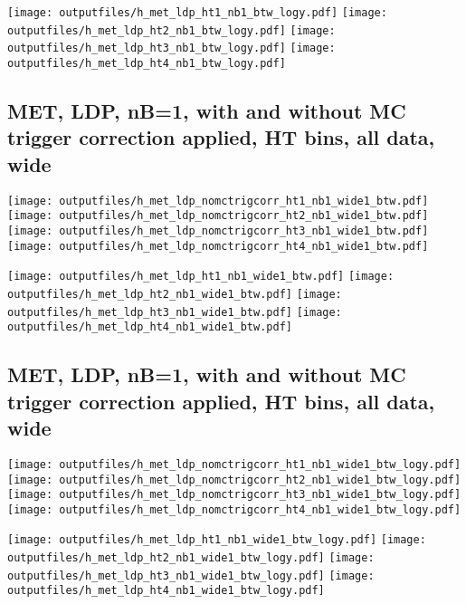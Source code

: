 \documentclass[11pt]{article}
\begin{document}
    \noindent
     \texttt{[image: outputfiles/h\_met\_ldp\_ht1\_nb1\_btw\_logy.pdf]}
     \texttt{[image: outputfiles/h\_met\_ldp\_ht2\_nb1\_btw\_logy.pdf]}
     \texttt{[image: outputfiles/h\_met\_ldp\_ht3\_nb1\_btw\_logy.pdf]}
     \texttt{[image: outputfiles/h\_met\_ldp\_ht4\_nb1\_btw\_logy.pdf]}


    \clearpage
     \subsection{ MET, LDP, nB=1, with and without MC trigger correction applied, HT bins, all data, wide}

    \noindent
     \texttt{[image: outputfiles/h\_met\_ldp\_nomctrigcorr\_ht1\_nb1\_wide1\_btw.pdf]}
     \texttt{[image: outputfiles/h\_met\_ldp\_nomctrigcorr\_ht2\_nb1\_wide1\_btw.pdf]}
     \texttt{[image: outputfiles/h\_met\_ldp\_nomctrigcorr\_ht3\_nb1\_wide1\_btw.pdf]}
     \texttt{[image: outputfiles/h\_met\_ldp\_nomctrigcorr\_ht4\_nb1\_wide1\_btw.pdf]}

    \noindent
     \texttt{[image: outputfiles/h\_met\_ldp\_ht1\_nb1\_wide1\_btw.pdf]}
     \texttt{[image: outputfiles/h\_met\_ldp\_ht2\_nb1\_wide1\_btw.pdf]}
     \texttt{[image: outputfiles/h\_met\_ldp\_ht3\_nb1\_wide1\_btw.pdf]}
     \texttt{[image: outputfiles/h\_met\_ldp\_ht4\_nb1\_wide1\_btw.pdf]}

    \clearpage
     \subsection{ MET, LDP, nB=1, with and without MC trigger correction applied, HT bins, all data, wide}

    \noindent
     \texttt{[image: outputfiles/h\_met\_ldp\_nomctrigcorr\_ht1\_nb1\_wide1\_btw\_logy.pdf]}
     \texttt{[image: outputfiles/h\_met\_ldp\_nomctrigcorr\_ht2\_nb1\_wide1\_btw\_logy.pdf]}
     \texttt{[image: outputfiles/h\_met\_ldp\_nomctrigcorr\_ht3\_nb1\_wide1\_btw\_logy.pdf]}
     \texttt{[image: outputfiles/h\_met\_ldp\_nomctrigcorr\_ht4\_nb1\_wide1\_btw\_logy.pdf]}

    \noindent
     \texttt{[image: outputfiles/h\_met\_ldp\_ht1\_nb1\_wide1\_btw\_logy.pdf]}
     \texttt{[image: outputfiles/h\_met\_ldp\_ht2\_nb1\_wide1\_btw\_logy.pdf]}
     \texttt{[image: outputfiles/h\_met\_ldp\_ht3\_nb1\_wide1\_btw\_logy.pdf]}
     \texttt{[image: outputfiles/h\_met\_ldp\_ht4\_nb1\_wide1\_btw\_logy.pdf]}
\end{document}
